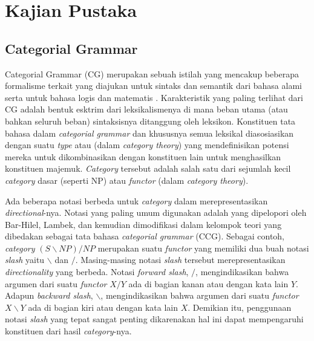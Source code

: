 \chapter{Kajian Pustaka}

\section{Categorial Grammar}
Categorial Grammar (CG) merupakan sebuah istilah yang mencakup beberapa formalisme terkait yang diajukan
untuk sintaks dan semantik dari bahasa alami serta untuk bahasa logis dan matematis \cite{Steedman92catg}.
Karakteristik yang paling terlihat dari CG adalah bentuk esktrim dari leksikalismenya di mana beban utama
(atau bahkan seluruh beban) sintaksisnya ditanggung oleh leksikon.
Konstituen tata bahasa dalam \textit{categorial grammar} dan khususnya semua leksikal diasosiasikan
dengan suatu \textit{type} atau  (dalam \textit{category theory}) yang
mendefinisikan potensi mereka untuk dikombinasikan dengan konstituen lain untuk menghasilkan konstituen
majemuk.
\textit{Category} tersebut adalah salah satu dari sejumlah kecil \textit{category} dasar (seperti NP)
atau \textit{functor} (dalam \textit{category theory}).

Ada beberapa notasi berbeda untuk \textit{category} dalam merepresentasikan \textit{directional}-nya.
Notasi yang paling umum digunakan adalah  yang dipelopori oleh Bar-Hilel,
Lambek, dan kemudian dimodifikasi dalam kelompok teori yang dibedakan sebagai tata bahasa
 \textit{categorial grammar} (CCG).
Sebagai contoh, \textit{category} $(S\backslash{}NP)/NP$ merupakan suatu \textit{functor} yang memiliki
dua buah notasi \textit{slash} yaitu $\backslash$ dan $/$.
Masing-masing notasi \textit{slash} tersebut merepresentasikan \textit{directionality} yang berbeda.
Notasi \textit{forward slash}, $/$, mengindikasikan bahwa argumen dari suatu \textit{functor}
$X/Y$ ada di bagian kanan atau dengan kata lain $Y$.
Adapun \textit{backward slash}, $\backslash$, mengindikasikan bahwa argumen dari suatu \textit{functor}
$X\backslash{}Y$ ada di bagian kiri atau dengan kata lain $X$.
Demikian itu, penggunaan notasi \textit{slash} yang tepat sangat penting dikarenakan hal ini dapat
mempengaruhi konstituen dari hasil  \textit{category}-nya.

